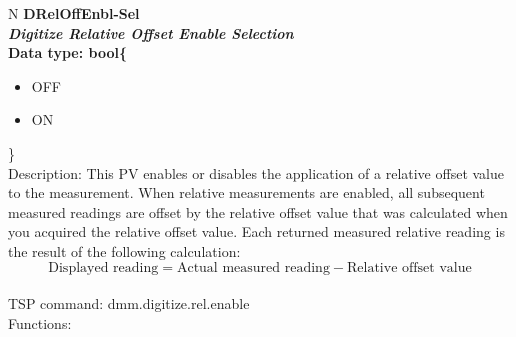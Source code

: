 \documentclass[openany]{article}
\begin{document}
		\begin{tabular}{N}
			\hline
			\bfseries DRelOffEnbl-Sel\label{pv:dreloffenbl-sel} \\ \hline
			\emph{Digitize Relative Offset Enable Selection} \\
			Data type: bool\{\begin{itemize}[noitemsep]
				\small
				\item[] OFF
				\item[] ON
			\end{itemize}\} \\
			Description: This PV enables or disables the application of a relative offset value to the measurement. When relative measurements are enabled, all subsequent measured readings are offset by the relative offset value that was calculated when you acquired the relative offset value. Each returned measured relative reading is the result of the following calculation: $$\text{Displayed reading} = \text{Actual measured reading} - \text{Relative offset value}$$ \\
			TSP command: dmm.digitize.rel.enable \\
			Functions: \\
			\arrayrulecolor{\FuncTableBorderColor}

		\end{tabular}
\end{document}
